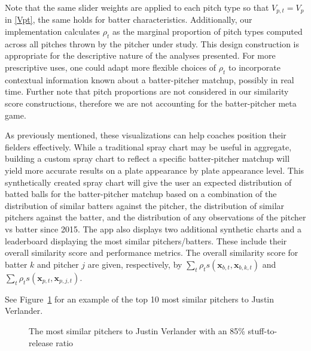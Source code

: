 \documentclass[12pt]{article}
\newcommand{\x}{\textbf{x}}
\begin{document}
Note that the same slider weights are applied to each pitch type so that $V_{p,t} = V_p$ in \eqref{Vpt}, the same holds for batter characteristics. Additionally, our implementation calculates $\rho_t$ as the marginal proportion of pitch types computed across all pitches thrown by the pitcher under study. This design construction is appropriate for the descriptive nature of the analyses presented. For more prescriptive uses, one could adapt more flexible choices of $\rho_t$ to incorporate contextual information known about a batter-pitcher matchup, possibly in real time. Further note that pitch proportions are not considered in our similarity score constructions, therefore we are not accounting for the batter-pitcher meta game.


As previously mentioned, these visualizations can help coaches position their fielders effectively. While a traditional spray chart may be useful in aggregate, building a custom spray chart to reflect a specific batter-pitcher matchup will yield more accurate results on a plate appearance by plate appearance level. This synthetically created spray chart will give the user an expected distribution of batted balls for the batter-pitcher matchup based on a combination of the distribution of similar batters against the pitcher, the distribution of similar pitchers against the batter, and the distribution of any observations of the pitcher vs batter since 2015. The app also displays two additional synthetic charts and a leaderboard displaying the most similar pitchers/batters. These include their overall similarity score and performance metrics. The overall similarity score for batter $k$ and pitcher $j$ are given, respectively, by $\sum_t\rho_t s(\x_{b,t},\x_{b,k,t})$ and $\sum_t\rho_t s(\x_{p,t},\x_{p,j,t})$.

See Figure~\ref{synthpitcher} for an example of the top 10 most similar pitchers to Justin Verlander.

\begin{figure}
\centering
{}
    \caption{The most similar pitchers to Justin Verlander with an 85\% stuff-to-release ratio}
    \label{synthpitcher}
\end{figure}
\end{document}
